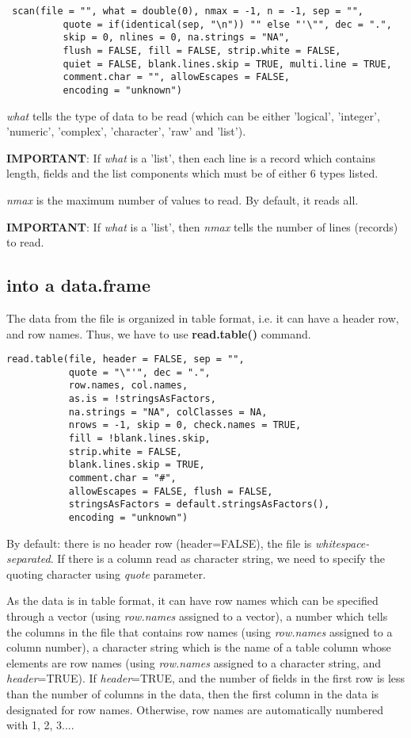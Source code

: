\begin{lstlisting}
 scan(file = "", what = double(0), nmax = -1, n = -1, sep = "",
          quote = if(identical(sep, "\n")) "" else "'\"", dec = ".",
          skip = 0, nlines = 0, na.strings = "NA",
          flush = FALSE, fill = FALSE, strip.white = FALSE,
          quiet = FALSE, blank.lines.skip = TRUE, multi.line = TRUE,
          comment.char = "", allowEscapes = FALSE,
          encoding = "unknown")
\end{lstlisting}
{\it what} tells the type of data to be read (which can be either
'logical', 'integer', 'numeric', 'complex', 'character', 'raw' and
'list').

{\bf IMPORTANT}: If {\it what} is a 'list', then each line is a record
which contains length, fields and the list components which must be of
either 6 types listed.

{\it nmax} is the maximum number of values to read. By default, it
reads all. 

{\bf IMPORTANT}: If {\it what} is a 'list', then {\it nmax} tells the
number of lines (records) to read. 

\subsection{into a data.frame}
\label{sec:into-data.frame}

The data from the file is organized in table format, i.e. it can have
a header row, and row names. Thus, we have to use {\bf read.table()}
command. 

\begin{lstlisting}
read.table(file, header = FALSE, sep = "", 
           quote = "\"'", dec = ".", 
           row.names, col.names,
           as.is = !stringsAsFactors,
           na.strings = "NA", colClasses = NA, 
           nrows = -1, skip = 0, check.names = TRUE, 
           fill = !blank.lines.skip,
           strip.white = FALSE, 
           blank.lines.skip = TRUE,
           comment.char = "#",
           allowEscapes = FALSE, flush = FALSE,
           stringsAsFactors = default.stringsAsFactors(),
           encoding = "unknown")
\end{lstlisting}
By default: there is no header row (header=FALSE), the file is {\it
  whitespace-separated}. If there is a column read as character
string, we need to specify the quoting character using {\it quote}
parameter. 

As the data is in table format, it can have row names which can be
specified through a vector (using {\it row.names} assigned to a
vector), a number which tells the columns in the file that contains
row names (using {\it row.names} assigned to a column number), a
character string which is the name of a table column whose elements
are row names (using {\it row.names} assigned to a character string,
and {\it header}=TRUE). If {\it header}=TRUE, and the number of fields
in the first row is less than the number of columns in the data, then
the first column in the data is designated for row names. Otherwise,
row names are automatically numbered with 1, 2, 3.... 


